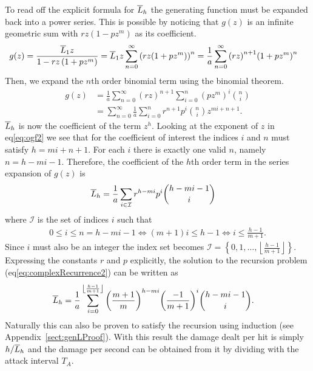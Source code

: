 To read off the explicit formula for $\overline{L}_h$ the generating function must be expanded back into a power series. This is possible by noticing that $g(z)$ is an infinite geometric sum with $rz(1 - pz^m)$ as its coefficient.
\begin{align}
    g(z) &= \frac{\overline{L}_1 z}{1 - rz\left(1 + pz^{m}\right)}\nonumber
    = \overline{L}_1 z\sum_{n=0}^\infty {(rz(1 + pz^m))}^n\nonumber
    = \frac{1}{a} \sum_{n=0}^\infty {(rz)}^{n+1}{(1 + pz^m)}^n
\end{align}
Then, we expand the $n$th order binomial term using the binomial theorem.
\begin{align}
    g(z) &= \frac{1}{a} \sum_{n=0}^\infty {(rz)}^{n+1}\sum_{i=0}^{n} {(pz^m)}^i {n \choose i}\nonumber\\
         &= \sum_{n=0}^\infty \frac{1}{a}\sum_{i=0}^{n} r^{n+1} p^i {n \choose i}z^{mi+n+1}\label{eq:ogf2}.
\end{align}
$\overline{L}_h$ is now the coefficient of the term $z^h$. Looking at the exponent of $z$ in eq\ref{eq:ogf2} we see that for the coefficient of interest the indices $i$ and $n$ must satisfy $h=mi+n+1$. For each $i$ there is exactly one valid $n$, namely $n = h-mi-1$.
Therefore, the coefficient of the $h$th order term in the series expansion of $g(z)$ is
\begin{align}
    \overline{L}_h &= \frac{1}{a}\sum_{i \in \mathcal{I}} r^{h-mi} p^i {h-mi-1 \choose i} \nonumber
\end{align}
where $\mathcal{I}$ is the set of indices $i$ such that
\begin{align*}
    0 \leq i \leq n = h-mi-1
    \iff (m+1)i \leq h-1
    \iff i \leq \frac{h-1}{m+1}.
\end{align*}
Since $i$ must also be an integer the index set becomes $\mathcal{I} = \left\{0,1,\ldots,\left\lfloor{\frac{h-1}{m+1}}\right\rfloor\right\}$. Expressing the constants $r$ and $p$ explicitly, the solution to the recursion problem (eq\ref{eq:complexRecurrence2}) can be written as
\begin{align}
    \overline{L}_h &= \frac{1}{a}\sum_{i=0}^{\left\lfloor{\frac{h-1}{m+1}}\right\rfloor} {\left(\frac{m+1}{m}\right)}^{h-mi} {\left(\frac{-1}{m+1}\right)}^i {h-mi-1 \choose i}.\label{eq:explicitL}
\end{align}
Naturally this can also be proven to satisfy the recursion using induction (see Appendix~\ref{sect:genLProof}). With this result the damage dealt per hit is simply $h/\overline{L}_h$ and the damage per second can be obtained from it by dividing with the attack interval $T_A$.


